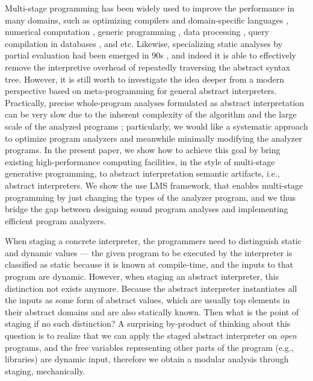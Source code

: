 Multi-stage programming has been widely used to improve the performance in many domains, 
such as optimizing compilers and domain-specific languages \cite{DBLP:conf/pldi/RompfSBLCO14, DBLP:conf/snapl/RompfBLSJAOSKDK15,
DBLP:journals/tecs/SujeethBLRCOO14, DBLP:conf/gpce/SujeethGBLROO13, DBLP:journals/jfp/CaretteKS09},
numerical computation \cite{PGL-038, DBLP:conf/pepm/AktemurKKS13}, 
generic programming \cite{DBLP:journals/pacmpl/Yallop17}, 
data processing \cite{DBLP:conf/oopsla/JonnalageddaCSRO14, DBLP:conf/popl/KiselyovBPS17}, 
query compilation in databases \cite{DBLP:conf/osdi/EssertelTDBOR18, DBLP:conf/sigmod/TahboubER18},
and etc.
Likewise, specializing static analyses by partial evaluation had been emerged in 90s 
\cite{damian1999partial, amtoft1999partial, Boucher:1996:ACN:647473.727587, ashley:practical}, 
and indeed it is able to effectively remove the interpretive overhead of 
repeatedly traversing the abstract syntax tree. However, it is still worth 
to investigate the idea deeper from a modern perspective based on meta-programming 
for general abstract interpreters.
Practically, precise whole-program analyses formulated as abstract interpretation 
can be very slow due to the inherent complexity of the algorithm and the large scale 
of the analyzed programs \cite{toman_et_al:LIPIcs:2017:7121} ;
particularly, we would like a systematic approach to optimize program 
analyzers and meanwhile minimally modifying the analyzer programs.
In the present paper, we show how to achieve this goal by bring existing 
high-performance computing facilities, in the style of multi-stage generative
programming, to abstract interpretation semantic artifacts, i.e., 
abstract interpreters. We show the use LMS framework, that enables 
multi-stage programming by just changing the types of the analyzer 
program, and we thus bridge the gap between designing sound program 
analyses and implementing efficient program analyzers.

When staging a concrete interpreter, the programmers need to distinguish 
static and dynamic values --- the given program to be executed by the 
interpreter is classified as static because it is known at compile-time, 
and the inputs to that program are dynamic.  However, when staging an 
abstract interpreter, this distinction not exists anymore. Because the 
abstract interpreter instantiates all the inputs as some form of abstract 
values, which are usually top elements in their abstract domains and are 
also statically known. Then what is the point of staging if no such distinction?
A surprising by-product of thinking about this question is to realize that 
we can apply the staged abstract interpreter on \textit{open} programs, and
the free variables representing other parts of the program (e.g., libraries) 
are dynamic input, therefore we obtain a modular analysis through staging, 
mechanically. 

